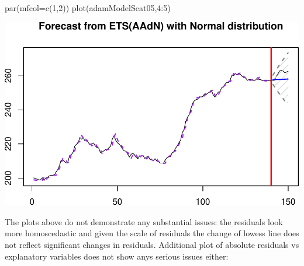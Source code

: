 \documentclass[
]{book}
\newenvironment{Shaded}{\begin{snugshade}}{\end{snugshade}}
\newcommand{\AttributeTok}[1]{\textcolor[rgb]{0.77,0.63,0.00}{#1}}
\newcommand{\ConstantTok}[1]{\textcolor[rgb]{0.00,0.00,0.00}{#1}}
\newcommand{\DecValTok}[1]{\textcolor[rgb]{0.00,0.00,0.81}{#1}}
\newcommand{\FunctionTok}[1]{\textcolor[rgb]{0.00,0.00,0.00}{#1}}
\newcommand{\NormalTok}[1]{#1}
\newcommand{\SpecialCharTok}[1]{\textcolor[rgb]{0.00,0.00,0.00}{#1}}
\theoremstyle{definition}
\theoremstyle{definition}
\theoremstyle{definition}
\theoremstyle{definition}
\theoremstyle{remark}
\begin{document}
\begin{Shaded}
\begin{Highlighting}[]
\FunctionTok{par}\NormalTok{(}\AttributeTok{mfcol=}\FunctionTok{c}\NormalTok{(}\DecValTok{1}\NormalTok{,}\DecValTok{2}\NormalTok{))}
\FunctionTok{plot}\NormalTok{(adamModelSeat05,}\DecValTok{4}\SpecialCharTok{:}\DecValTok{5}\NormalTok{)}
\end{Highlighting}
\end{Shaded}

\includegraphics{adam_files/figure-latex/unnamed-chunk-158-1.pdf}

The plots above do not demonstrate any substantial issues: the residuals look more homoscedastic and given the scale of residuals the change of lowess line does not reflect significant changes in residuals. Additional plot of absolute residuals vs explanatory variables does not show anys serious issues either:

\begin{Shaded}
\end{Shaded}
\end{document}
